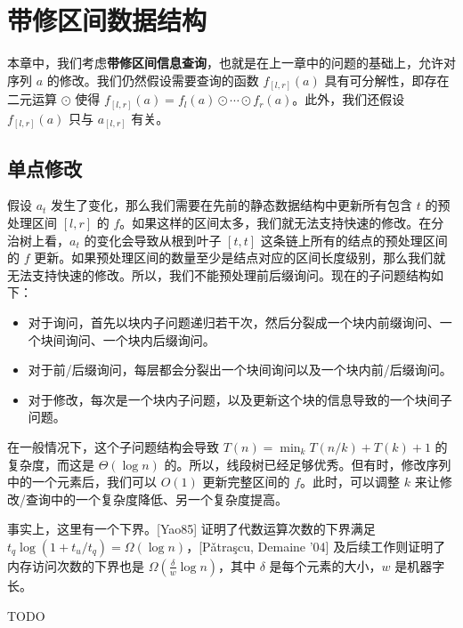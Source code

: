 \chapter{带修区间数据结构}

本章中，我们考虑\textbf{带修区间信息查询}，也就是在上一章中的问题的基础上，允许对序列 $a$ 的修改。我们仍然假设需要查询的函数 $f_{[l,r]}(a)$ 具有可分解性，即存在二元运算 $\odot$ 使得 $f_{[l,r]}(a)=f_l(a)\odot\cdots\odot f_r(a)$。此外，我们还假设 $f_{[l,r]}(a)$ 只与 $a_{[l,r]}$ 有关。  

\section{单点修改}

假设 $a_t$ 发生了变化，那么我们需要在先前的静态数据结构中更新所有包含 $t$ 的预处理区间 $[l,r]$ 的 $f$。如果这样的区间太多，我们就无法支持快速的修改。在分治树上看，$a_t$ 的变化会导致从根到叶子 $[t,t]$ 这条链上所有的结点的预处理区间的 $f$ 更新。如果预处理区间的数量至少是结点对应的区间长度级别，那么我们就无法支持快速的修改。所以，我们不能预处理前后缀询问。现在的子问题结构如下：

\begin{itemize}
    \item 对于询问，首先以块内子问题递归若干次，然后分裂成一个块内前缀询问、一个块间询问、一个块内后缀询问。
    \item 对于前/后缀询问，每层都会分裂出一个块间询问以及一个块内前/后缀询问。
    \item 对于修改，每次是一个块内子问题，以及更新这个块的信息导致的一个块间子问题。
\end{itemize}

在一般情况下，这个子问题结构会导致 $T(n)=\min_k T(n/k)+T(k)+1$ 的复杂度，而这是 $\Theta(\log n)$ 的。所以，线段树已经足够优秀。但有时，修改序列中的一个元素后，我们可以 $O(1)$ 更新完整区间的 $f$。此时，可以调整 $k$ 来让修改/查询中的一个复杂度降低、另一个复杂度提高。

\begin{remark}
    事实上，这里有一个下界。[Yao85] 证明了代数运算次数的下界满足 $t_q\log(1+t_u/t_q)=\Omega(\log n)$，[Pǎtraşcu, Demaine '04] 及后续工作则证明了内存访问次数的下界也是 $\Omega\left(\frac{\delta}{w}\log n\right)$，其中 $\delta$ 是每个元素的大小，$w$ 是机器字长。
\end{remark}

\begin{example}[多叉线段树]
    TODO
\end{example}

